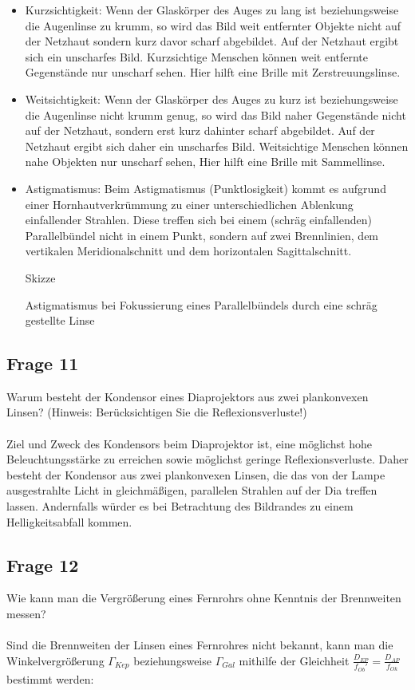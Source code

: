\documentclass[a4paper,10pt]{scrartcl}
\begin{document}
		\begin{itemize}
			\item Kurzsichtigkeit: Wenn der Glaskörper des Auges zu lang ist beziehungsweise die Augenlinse zu krumm, so wird das Bild weit entfernter Objekte nicht auf der Netzhaut sondern kurz davor scharf abgebildet. Auf der Netzhaut ergibt sich ein unscharfes Bild. Kurzsichtige Menschen können weit entfernte Gegenstände nur unscharf sehen. Hier hilft eine Brille mit Zerstreuungslinse.
			\item Weitsichtigkeit: Wenn der Glaskörper des Auges zu kurz ist beziehungsweise die Augenlinse nicht krumm genug, so wird das Bild naher Gegenstände nicht auf der Netzhaut, sondern erst kurz dahinter scharf abgebildet. Auf der Netzhaut ergibt sich daher ein unscharfes Bild. Weitsichtige Menschen können nahe Objekten nur unscharf sehen, Hier hilft eine Brille mit Sammellinse.
			\item Astigmatismus: Beim Astigmatismus (Punktlosigkeit) kommt es aufgrund einer Hornhautverkrümmung zu einer unterschiedlichen Ablenkung einfallender Strahlen. Diese treffen sich bei einem (schräg einfallenden) Parallelbündel nicht in einem Punkt, sondern auf zwei Brennlinien, dem vertikalen Meridionalschnitt und dem horizontalen Sagittalschnitt.
			
				\begin{center}
				Skizze
				\end{center}
	
				Astigmatismus bei Fokussierung eines Parallelbündels durch eine schräg gestellte Linse
		\end{itemize}
	\subsection{Frage 11}
		Warum besteht der Kondensor eines Diaprojektors aus zwei plankonvexen Linsen? (Hinweis: Berücksichtigen Sie die Reflexionsverluste!)
		\\
		\\
		Ziel und Zweck des Kondensors beim Diaprojektor ist, eine möglichst hohe Beleuchtungsstärke zu erreichen sowie möglichst geringe Reflexionsverluste. Daher besteht der Kondensor aus zwei plankonvexen Linsen, die das von der Lampe ausgestrahlte Licht in gleichmäßigen, parallelen Strahlen auf der Dia treffen lassen. Andernfalls würder es bei Betrachtung des Bildrandes zu einem Helligkeitsabfall kommen.
	\subsection{Frage 12}
		Wie kann man die Vergrößerung eines Fernrohrs ohne Kenntnis der Brennweiten messen?
		\\
		\\
		Sind die Brennweiten der Linsen eines Fernrohres nicht bekannt, kann man die Winkelvergrößerung $\Gamma_{Kep}$ beziehungsweise $\Gamma_{Gal}$ mithilfe der Gleichheit $\frac{D_{EP}}{f_{Ob}'}=\frac{D_{AP}}{f_{Ok}}$ bestimmt werden:
	
\end{document}
